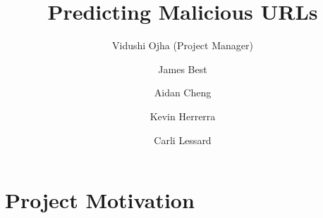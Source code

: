 \documentclass[cs,proposal]{hmcclinic}
\title{Predicting Malicious URLs}
\author{Vidushi Ojha (Project Manager) \and James Best \and Aidan Cheng \and Kevin Herrerra \and Carli Lessard}
\begin{document}

\maketitle

\tableofcontents








\newpage

\section{Project Motivation}
\end{document}
